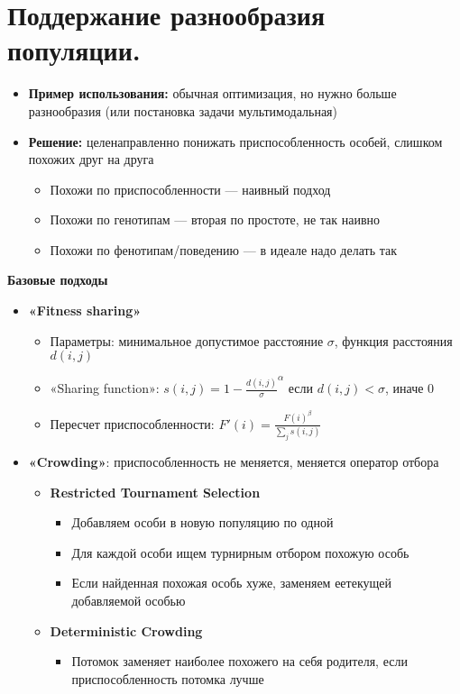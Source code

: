 \section{Поддержание разнообразия популяции.}

\begin{itemize}
    \item \textbf{Пример использования:} обычная оптимизация, но нужно больше разнообразия (или постановка задачи мультимодальная)
    \item \textbf{Решение:} целенаправленно понижать приспособленность особей, слишком похожих друг на друга
    \begin{itemize}
        \item Похожи по приспособленности — наивный подход 
        \item Похожи по генотипам — вторая по простоте, не так наивно
        \item Похожи по фенотипам/поведению — в идеале надо делать так
    \end{itemize}
\end{itemize}

\textbf{Базовые подходы}
\begin{itemize}
    \item \textbf{«Fitness sharing»}
    \begin{itemize}
        \item Параметры: минимальное допустимое расстояние $\sigma$, функция расстояния $d(i, j)$
        \item«Sharing function»: $s(i,j) = 1 - \frac{d(i,j)}{\sigma}^\alpha$ если $d(i,j)< \sigma$, иначе 0
        \item Пересчет приспособленности: $F'(i) = \frac{F(i)^\beta}{\sum_j s(i,j)}$
    \end{itemize}
    \item \textbf{«Crowding»}: приспособленность не меняется, меняется оператор отбора 
    \begin{itemize}
        \item \textbf{Restricted Tournament Selection}
        \begin{itemize}
            \item Добавляем особи в новую популяцию по одной
            \item Для каждой особи ищем турнирным отбором похожую особь
            \item Если найденная похожая особь хуже, заменяем еетекущей добавляемой особью
        \end{itemize}
        \item \textbf{Deterministic Crowding}
        \begin{itemize}
            \item Потомок заменяет наиболее похожего на себя родителя, если приспособленность потомка лучше    
        \end{itemize}
    \end{itemize}
\end{itemize}



